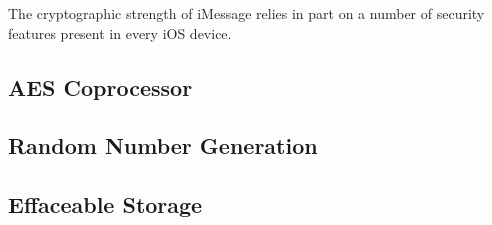 The cryptographic strength of iMessage relies in part on a number of security
features present in every iOS device.

\subsection{AES Coprocessor}

\subsection{Random Number Generation}

\subsection{Effaceable Storage}
